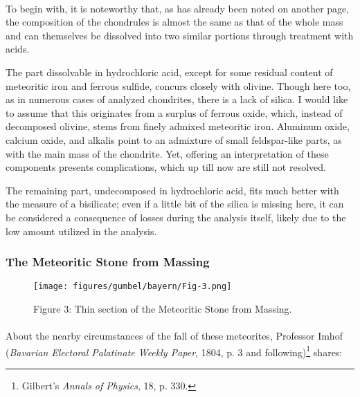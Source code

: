 \documentclass[a4paper, 12pt, oneside]{article}
\begin{document}
\paragraph*{}
To begin with, it is noteworthy that, as has already been noted on another page, the composition of the chondrules is almost the same as that of the whole mass and can themselves be dissolved into two similar portions through treatment with acids. 

The part dissolvable in hydrochloric acid, except for some residual content of meteoritic iron and ferrous sulfide, concurs closely with olivine. Though here too, as in numerous cases of analyzed chondrites, there is a lack of silica. I would like to assume that this originates from a surplus of ferrous oxide, which, instead of decomposed olivine, stems from finely admixed meteoritic iron. Aluminum oxide, calcium oxide, and alkalis point to an admixture of small feldspar-like parts, as with the main mass of the chondrite. Yet, offering an interpretation of these components presents complications, which up till now are still not resolved.

The remaining part, undecomposed in hydrochloric acid, fits much better with the measure of a bisilicate; even if a little bit of the silica is missing here, it can be considered a consequence of losses during the analysis itself, likely due to the low amount utilized in the analysis.
\clearpage
\subsubsection{The Meteoritic Stone from Massing}
\begin{figure}[h]
\centering
\texttt{[image: figures/gumbel/bayern/Fig-3.png]}
\caption{Figure 3: Thin section of the Meteoritic Stone from Massing.}
\end{figure}
\paragraph*{}
About the nearby circumstances of the fall of these meteorites, Professor Imhof (\emph{Bavarian Electoral Palatinate Weekly Paper}, 1804, p. 3 and following)\footnote{Gilbert's \emph{Annals of Physics}, 18, p. 330.} shares:
\end{document}
